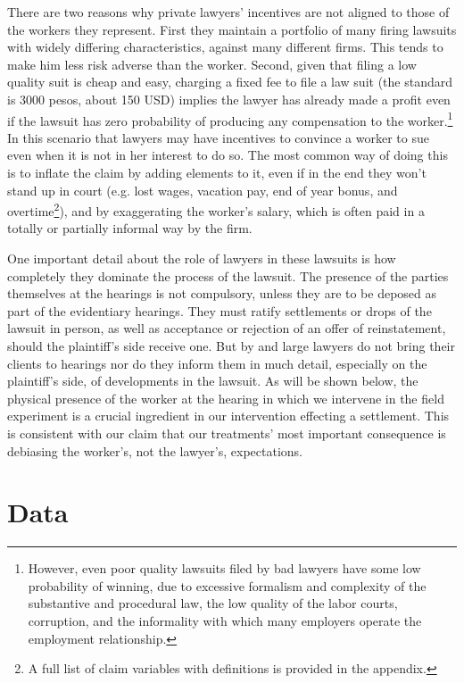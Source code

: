 \documentclass[11pt]{article}
\begin{document}
There are two reasons why private lawyers' incentives are not aligned to those of the workers they represent. First they maintain a portfolio of many firing lawsuits with widely differing characteristics, against many different firms. This tends to make him less risk adverse than the worker. Second, given that filing a low quality suit is cheap and easy, charging a fixed fee to file a law suit (the standard is 3000 pesos, about 150 USD) implies the lawyer has already made a profit even if the lawsuit has zero probability of producing any compensation to the worker.\footnote{However, even poor quality lawsuits filed by bad lawyers have some low probability of winning, due to excessive formalism and complexity of the substantive and procedural law, the low quality of the labor courts, corruption, and the informality with which many employers operate the employment relationship.} In this scenario that lawyers may have incentives to convince a worker to sue even when it is not in her interest to do so. The most common way of doing this is to inflate the claim by adding elements to it, even if in the end they won't stand up in court (e.g. lost wages, vacation pay, end of year bonus, and overtime\footnote{A full list of claim variables with definitions is provided in the appendix.}), and by exaggerating the worker's salary, which is often paid in a totally or partially informal way by the firm.

One important detail about the role of lawyers in these lawsuits is how completely they dominate the process of the lawsuit. The presence of the parties themselves at the hearings is not compulsory, unless they are to be deposed as part of the evidentiary hearings. They must ratify settlements or drops of the lawsuit in person, as well as acceptance or rejection of an offer of reinstatement, should the plaintiff's side receive one. But by and large lawyers do not bring their clients to hearings nor do they inform them in much detail, especially on the plaintiff's side, of developments in the lawsuit. As will be shown below, the physical presence of the worker at the hearing in which we intervene in the field experiment is a crucial ingredient in our intervention effecting a settlement. This is consistent with our claim that our treatments' most important consequence is debiasing the worker's, not the lawyer's, expectations.


\section{Data} \label{DataSection}
\end{document}
